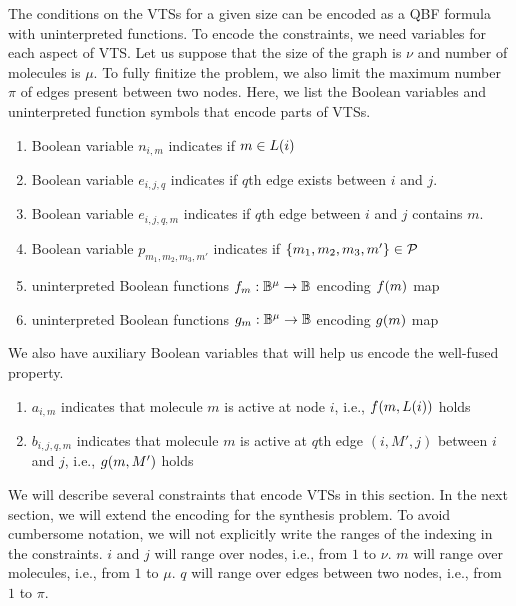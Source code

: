 The conditions on the VTSs for a given size can be encoded as a QBF formula
with uninterpreted functions.
%
To encode the constraints, we need variables for each aspect of
VTS.
%
Let us suppose that the size of the graph is $\nu$ and number of
molecules is $\mu$.
%
To fully finitize the problem, we also limit the maximum number $\pi$
of edges present between two nodes.
%
Here, we list the Boolean variables and uninterpreted function symbols
that encode parts of VTSs.
\begin{enumerate}

\item Boolean variable $n_{i,m}$ indicates if $m \in L(i)$
\item Boolean variable $e_{i,j,q}$ indicates if $q$th edge exists between $i$ and $j$.
\item Boolean variable $e_{i,j,q,m}$ indicates if $q$th edge between $i$ and $j$ contains $m$.
\item Boolean variable $p_{m_1,m_2,m_3,m'}$ indicates if $\{m_1,m_2,m_3,m'\} \in \mathcal{P}$
\item uninterpreted Boolean functions $f_m : \mathbb{B}^\mu \rightarrow \mathbb{B}$
encoding $f(m)$ map
\item uninterpreted Boolean functions $g_m : \mathbb{B}^\mu \rightarrow \mathbb{B}$
encoding $g(m)$ map
\end{enumerate}
We also have auxiliary Boolean variables that will help us encode the well-fused property. 
\begin{enumerate}
\item $a_{i,m}$ indicates that molecule $m$ is active at node $i$, i.e., $f(m,L(i))$
  holds
\item $b_{i,j,q,m}$ indicates that molecule $m$ is active at $q$th edge $(i,M',j)$ between $i$ and $j$, i.e., $g(m,M')$ holds
\end{enumerate}

We will describe several constraints that encode VTSs in this section.
%
In the next section, we will extend the encoding for the synthesis problem.
%
To avoid cumbersome notation, we will not explicitly write the ranges
of the indexing in the constraints.
%
$i$ and $j$ will range over nodes, i.e., from $1$ to $\nu$.
%
$m$ will range over molecules, i.e., from $1$ to $\mu$.
%
$q$ will range over edges between two nodes, i.e., from $1$ to $\pi$.
%

